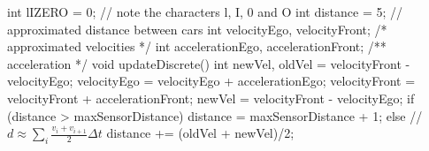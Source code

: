 \begin{uppaalcode}
int lIZERO = 0;   // note the characters l, I, 0 and O
int distance = 5; // approximated distance between cars
int velocityEgo, velocityFront; /* approximated velocities */
int accelerationEgo, accelerationFront; /** acceleration */
void updateDiscrete() {
    int newVel, oldVel = velocityFront - velocityEgo;
    velocityEgo = velocityEgo + accelerationEgo;
    velocityFront = velocityFront + accelerationFront;
    newVel = velocityFront - velocityEgo;
    if (distance > maxSensorDistance) {
        distance = maxSensorDistance + 1;
    } else { // $d \approx \sum_i \frac{v_i+v_{i+1}}{2}\Delta t$
        distance += (oldVel + newVel)/2;
    }
}
\end{uppaalcode}
